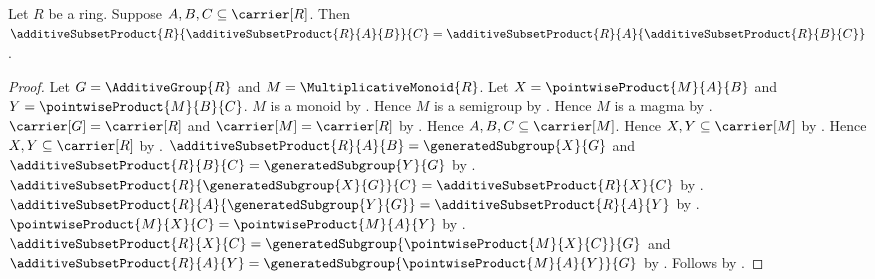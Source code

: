\begin{theorem}\label{additive_subset_product_associative}
    Let $R$ be a ring.
    Suppose $A,B,C\subseteq\carrier[R]$.
    Then
        $\additiveSubsetProduct{R}{
            \additiveSubsetProduct{R}{A}{B}}{C}
        =\additiveSubsetProduct{R}{A}{
            \additiveSubsetProduct{R}{B}{C}}$.
\end{theorem}
\begin{proof}
    Let $G=\AdditiveGroup{R}$ and $M=\MultiplicativeMonoid{R}$.
    Let $X=\pointwiseProduct{M}{A}{B}$ and
        $Y=\pointwiseProduct{M}{B}{C}$.
    $M$ is a monoid by .
    Hence $M$ is a semigroup by .
    Hence $M$ is a magma by .
    $\carrier[G]=\carrier[R]$ and $\carrier[M]=\carrier[R]$ by
        .
    Hence $A,B,C\subseteq\carrier[M]$.
    Hence $X,Y\subseteq\carrier[M]$ by
        .
    Hence $X,Y\subseteq\carrier[R]$ by \auto.
    $\additiveSubsetProduct{R}{A}{B}=\generatedSubgroup{X}{G}$ and
        $\additiveSubsetProduct{R}{B}{C}=\generatedSubgroup{Y}{G}$ by
        .
    $\additiveSubsetProduct{R}{\generatedSubgroup{X}{G}}{C}
        =\additiveSubsetProduct{R}{X}{C}$ by
        .
    $\additiveSubsetProduct{R}{A}{\generatedSubgroup{Y}{G}}
        =\additiveSubsetProduct{R}{A}{Y}$ by
        .
    $\pointwiseProduct{M}{X}{C}=\pointwiseProduct{M}{A}{Y}$ by
        .
    $\additiveSubsetProduct{R}{X}{C}
        =\generatedSubgroup{\pointwiseProduct{M}{X}{C}}{G}$ and
        $\additiveSubsetProduct{R}{A}{Y}
        =\generatedSubgroup{\pointwiseProduct{M}{A}{Y}}{G}$ by
        .
    Follows by \auto.
\end{proof}

